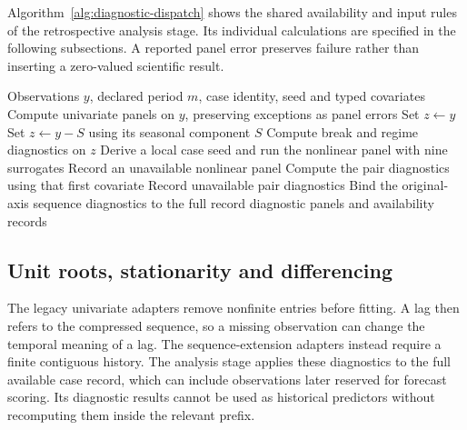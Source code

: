 Algorithm~\ref{alg:diagnostic-dispatch} shows the shared availability and input
rules of the retrospective analysis stage. Its individual calculations are
specified in the following subsections. A reported panel error preserves
failure rather than inserting a zero-valued scientific result.

\begin{algorithm}[htbp]
\caption{Dispatch retrospective diagnostic panels on one admitted series}
\label{alg:diagnostic-dispatch}
\begin{algorithmic}[1]
\Require Observations $y$, declared period $m$, case identity, seed and typed covariates
\State Compute univariate panels on $y$, preserving exceptions as panel errors
\State Set $z\gets y$
  \State Set $z\gets y-S$ using its seasonal component $S$
\EndIf
\State Compute break and regime diagnostics on $z$
  \State Derive a local case seed and run the nonlinear panel with nine surrogates
\Else
  \State Record an unavailable nonlinear panel
\EndIf
{}
  \State Compute the pair diagnostics using that first covariate
\Else
  \State Record unavailable pair diagnostics
\EndIf
\State Bind the original-axis sequence diagnostics to the full record
\State \Return diagnostic panels and availability records
\end{algorithmic}
\end{algorithm}

\subsection{Unit roots, stationarity and differencing}
\label{sec:diagnostic-stationarity}
The legacy univariate adapters remove nonfinite entries before fitting. A lag then refers to the compressed sequence, so a missing observation can change the temporal meaning of a lag. The sequence-extension adapters instead require a finite contiguous history. The analysis stage applies these diagnostics to the full available case record, which can include observations later reserved for forecast scoring. Its diagnostic results cannot be used as historical predictors without recomputing them inside the relevant prefix.

